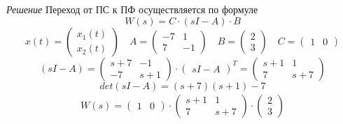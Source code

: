 \documentclass[../../TAU.tex]{subfiles}
\begin{document}
    \textit{Решение}
    {
        Переход от ПС к ПФ осуществляется по формуле 
        \[
            W(s)=C\cdot(sI-A)\cdot B
        \]
        \[
            x(t)=
            \begin{pmatrix}
                x_1(t) \\
                x_2(t)
            \end{pmatrix}
            \quad
            A=
            \begin{pmatrix}
                -7 &  1 \\
                 7 & -1                
            \end{pmatrix}
            \quad
            B=
            \begin{pmatrix}
                2 \\ 3                
            \end{pmatrix}
            \quad
            C=
            \begin{pmatrix}
                1 & 0               
            \end{pmatrix}
        \]
        \[
            (sI-A)=
            \begin{pmatrix}
                s+7 & -1  \\
                -7  & s+1                
            \end{pmatrix}
            \cdot
            \begin{pmatrix}
                sI-A                
            \end{pmatrix}^T
            =
            \begin{pmatrix}
                s+1 & 1   \\
                7   & s+7                
            \end{pmatrix}
        \]
        \[
            det(sI-A)=(s+7)(s+1)-7
        \]
        \begin{multline*}
            W(s)=
            \begin{pmatrix}
                1 & 0               
            \end{pmatrix}
            \cdot
            \begin{pmatrix}
                s+1 & 1   \\
                7   & s+7               
            \end{pmatrix}
            \cdot
            \begin{pmatrix}
                2 \\ 3               

\end{pmatrix}
\end{multline*}}
\end{document}
